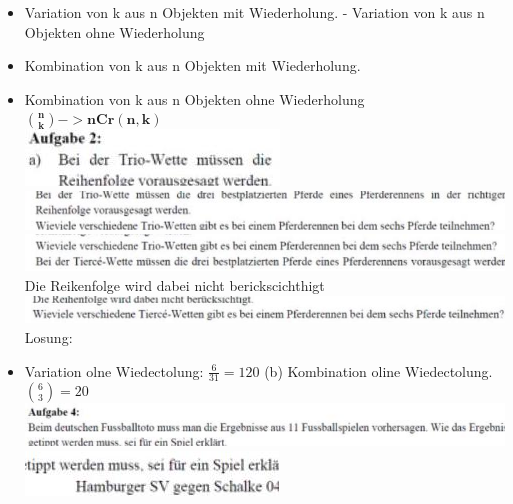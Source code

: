 \documentclass[10pt]{article}
\begin{document}
\begin{itemize}
  \item Variation von k aus n Objekten mit Wiederholung. - Variation von k aus n Objekten ohne Wiederholung
  \item Kombination von k aus n Objekten mit Wiederholung.
  \item Kombination von k aus n Objekten ohne Wiederholung\\
$\binom{\boldsymbol{n}}{\boldsymbol{k}}->\mathbf{n C r}(\mathbf{n}, \mathbf{k})$\\
\includegraphics[max width=\textwidth, center]{2024_12_29_0906b02acf849bda8665g-3(21)}\\
\includegraphics[max width=\textwidth, center]{2024_12_29_0906b02acf849bda8665g-3(8)}\\
\includegraphics[max width=\textwidth, center]{2024_12_29_0906b02acf849bda8665g-3(2)}\\
Die Reikenfolge wird dabei nicht berickscichthigt\\
\includegraphics[max width=\textwidth, center]{2024_12_29_0906b02acf849bda8665g-3(11)}\\
Losung:
  \item Variation olne Wiedectolung: $\frac{6}{31}=120$ (b) Kombination oline Wiedectolung. $\binom{6}{3}=20$\\
\includegraphics[max width=\textwidth, center]{2024_12_29_0906b02acf849bda8665g-3(17)}\\
\includegraphics[max width=\textwidth, center]{2024_12_29_0906b02acf849bda8665g-3(13)}\\

\end{itemize}
\end{document}
